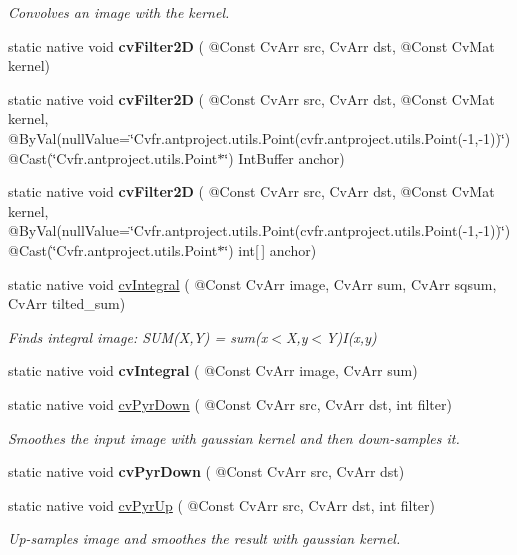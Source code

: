 \begin{DoxyCompactItemize}
\begin{DoxyCompactList}\small\item\em Convolves an image with the kernel. \end{DoxyCompactList}\item 
static native void {\bfseries cv\+Filter2D} ( @Const Cv\+Arr src, Cv\+Arr dst, @Const Cv\+Mat kernel)
\item 
static native void {\bfseries cv\+Filter2D} ( @Const Cv\+Arr src, Cv\+Arr dst, @Const Cv\+Mat kernel, @By\+Val(null\+Value=\char`\"{}Cv\+fr.antproject.utils.Point(cv\+fr.antproject.utils.Point(-\/1,-\/1))\char`\"{}) @Cast(\char`\"{}Cv\+fr.antproject.utils.Point$\ast$\char`\"{}) Int\+Buffer anchor)
\item 
static native void {\bfseries cv\+Filter2D} ( @Const Cv\+Arr src, Cv\+Arr dst, @Const Cv\+Mat kernel, @By\+Val(null\+Value=\char`\"{}Cv\+fr.antproject.utils.Point(cv\+fr.antproject.utils.Point(-\/1,-\/1))\char`\"{}) @Cast(\char`\"{}Cv\+fr.antproject.utils.Point$\ast$\char`\"{}) int\mbox{[}$\,$\mbox{]} anchor)
\item 
static native void \hyperlink{group__imgproc__c_ga08246108002aef3cbe4402ee61232191}{cv\+Integral} ( @Const Cv\+Arr image, Cv\+Arr sum, Cv\+Arr sqsum, Cv\+Arr tilted\+\_\+sum)
\begin{DoxyCompactList}\small\item\em Finds integral image\+: S\+U\+M(\+X,\+Y) = sum(x$<$\+X,y$<$\+Y)I(x,y) \end{DoxyCompactList}\item 
static native void {\bfseries cv\+Integral} ( @Const Cv\+Arr image, Cv\+Arr sum)
\item 
static native void \hyperlink{group__imgproc__c_ga728d5076e2233678be83cad3203472f9}{cv\+Pyr\+Down} ( @Const Cv\+Arr src, Cv\+Arr dst, int filter)
\begin{DoxyCompactList}\small\item\em Smoothes the input image with gaussian kernel and then down-\/samples it. \end{DoxyCompactList}\item 
static native void {\bfseries cv\+Pyr\+Down} ( @Const Cv\+Arr src, Cv\+Arr dst)
\item 
static native void \hyperlink{group__imgproc__c_ga08b1a7b3bf0f0c133345b307e6dfa952}{cv\+Pyr\+Up} ( @Const Cv\+Arr src, Cv\+Arr dst, int filter)
\begin{DoxyCompactList}\small\item\em Up-\/samples image and smoothes the result with gaussian kernel. \end{DoxyCompactList}\item 

\end{DoxyCompactItemize}
